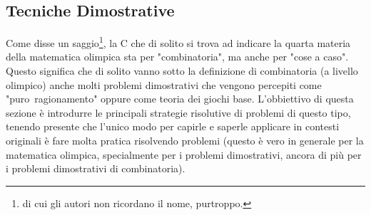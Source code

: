 \documentclass[11pt]{scrartcl}
\begin{document}
	\subsection{Tecniche Dimostrative}
	Come disse un saggio\footnote{di cui gli autori non ricordano il nome, purtroppo.}, la C che di solito si trova ad indicare la quarta materia della matematica olimpica sta per "combinatoria", ma anche per "cose a caso". \\
	Questo significa che di solito vanno sotto la definizione di combinatoria (a livello olimpico) anche molti problemi dimostrativi che vengono percepiti come \mbox{"puro ragionamento"} oppure come teoria dei giochi base. L'obbiettivo di questa sezione è introdurre le principali strategie risolutive di problemi di questo tipo, tenendo presente che l'unico modo per capirle e saperle applicare in contesti originali è fare molta pratica risolvendo problemi (questo è vero in generale per la matematica olimpica, specialmente per i problemi dimostrativi, ancora di più per i problemi dimostrativi di combinatoria).
	
\end{document}

